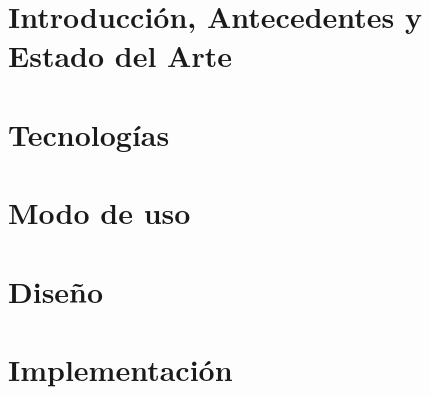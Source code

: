 \documentclass[spanish,a4paper,12pt,oneside]{extreport}
\begin{document}
\newpage{\pagestyle{empty}}

\newpage
\thispagestyle{empty}

\renewcommand{\thepage}{\arabic{page}}
\setcounter{page}{1}
\pagestyle{plain}

\chapter{\LARGE Introducción, Antecedentes y Estado del Arte}
\label{chapter:intro}



\newpage{\pagestyle{empty}}
\thispagestyle{empty}

\chapter{\LARGE Tecnologías}
\label{chapter:dos}



\newpage{\pagestyle{empty}}
\thispagestyle{empty}

\chapter{\LARGE Modo de uso}
\label{chapter:modo-de-uso}


\newpage{\pagestyle{empty}}
\thispagestyle{empty}

\chapter{\LARGE Diseño}
\label{chapter:tres}



\newpage{\pagestyle{empty}}
\thispagestyle{empty}

\chapter{\LARGE Implementación}
\label{chapter:cuatro}
\end{document}
